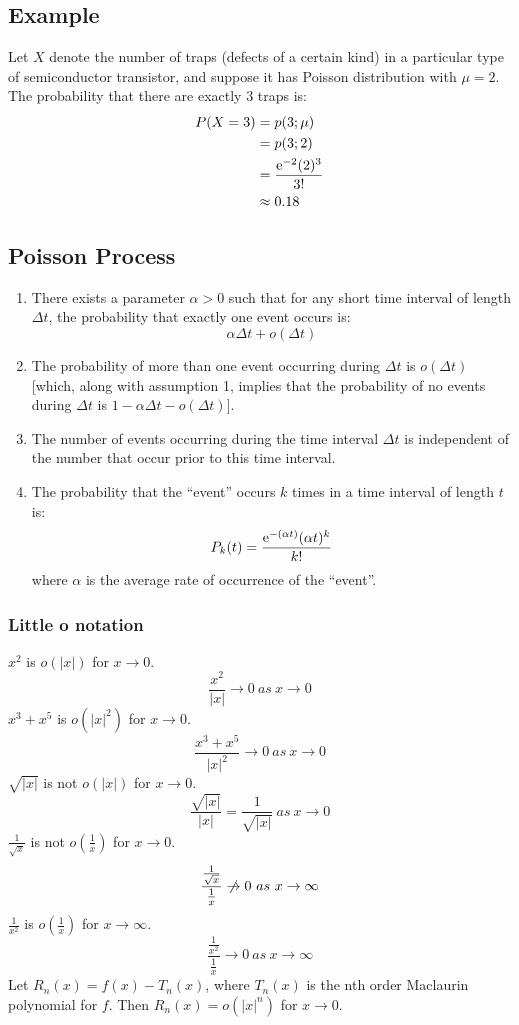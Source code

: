 \documentclass[letterpaper, 12pt]{math}
\begin{document}
\subsection*{Example}
Let \( X \) denote the number of traps (defects of a certain kind) in a
particular type of semiconductor transistor, and suppose it has Poisson
distribution with \( \mu = 2 \). The probability that there are exactly
3 traps is:
\begin{align*}
  P(X=3) &= p(3;\mu) \\
  &= p(3;2) \\
  &= \frac{\mathrm{e}^{-2}(2)^{3}}{3!} \\
  &\approx 0.18
\end{align*}

\subsection*{Poisson Process}
\begin{enumerate}
  \item There exists a parameter \( \alpha > 0 \) such that for any short time
    interval of length \( \Delta t \), the probability that exactly one
    event occurs is:
    \[ \alpha\Delta t+o(\Delta t) \]
  \item The probability of more than one event occurring during \( \Delta t \)
    is \( o(\Delta t) \) [which, along with assumption 1, implies that
    the probability of no events during \( \Delta t \) is
    \( 1-\alpha\Delta t-o(\Delta t) \)].
  \item The number of events occurring during the time interval \( \Delta t \)
    is independent of the number that occur prior to this time interval.
  \item The probability that the ``event'' occurs \( k \) times in a time
    interval of length \( t \) is:
    \[ P_{k}(t) = \frac{\mathrm{e}^{-(\alpha t)}(\alpha t)^{k}}{k!} \]
    where \( \alpha \) is the average rate of occurrence of the ``event''.
\end{enumerate}

\subsubsection*{Little o notation}
\( x^{2} \) is \( o(|x|) \) for \( x\to 0 \).
\[ \frac{x^{2}}{|x|} \to 0\ as\ x\to 0 \]
\( x^{3}+x^{5} \) is \( o(|x|^{2}) \) for \( x\to 0 \).
\[ \frac{x^{3}+x^{5}}{|x|^{2}} \to 0\ as\ x\to 0 \]
\( \sqrt{|x|} \) is not \( o(|x|) \) for \( x\to 0 \).
\[ \frac{\sqrt{|x|}}{|x|} = \frac{1}{\sqrt{|x|}}\ as\ x\to 0 \]
\( \frac{1}{\sqrt{x}} \) is not \( o(\frac{1}{x}) \) for \( x\to 0 \).
\[ \frac{\frac{1}{\sqrt{x}}}{\frac{1}{x}} \centernot\to 0\ as\ x\to\infty \]
\( \frac{1}{x^{2}} \) is \( o(\frac{1}{x}) \) for \( x\to\infty \).
\[ \frac{\frac{1}{x^{2}}}{\frac{1}{x}} \to 0\ as\ x\to\infty \]
Let \( R_{n}(x) = f(x)-T_{n}(x) \), where \( T_{n}(x) \) is the nth order
Maclaurin polynomial for \( f \). Then \( R_{n}(x) = o(|x|^{n}) \) for
\( x\to 0 \).
\end{document}
